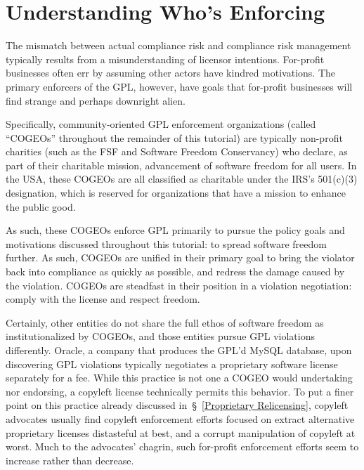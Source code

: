 \section{Understanding Who's Enforcing}
\label{compliance-understanding-whos-enforcing}

The mismatch between actual compliance risk and compliance risk management
typically results from a misunderstanding of licensor intentions.  For-profit
businesses often err by assuming other actors have kindred motivations.  The
primary enforcers of the GPL, however, have goals that for-profit businesses
will find strange and perhaps downright alien.

Specifically, community-oriented GPL enforcement organizations (called
``COGEOs'' throughout the remainder of this tutorial) are typically
non-profit charities (such as the FSF and Software Freedom Conservancy) who
declare, as part of their charitable mission, advancement of software freedom
for all users.  In the USA, these COGEOs are all classified as charitable
under the IRS's 501(c)(3) designation, which is reserved for organizations
that have a mission to enhance the public good.

As such, these COGEOs enforce GPL primarily to pursue the policy goals and
motivations discussed throughout this tutorial: to spread software freedom
further.  As such, COGEOs are unified in their primary goal to bring the
violator back into compliance as quickly as possible, and redress the damage
caused by the violation.  COGEOs are steadfast in their position in a
violation negotiation: comply with the license and respect freedom.

Certainly, other entities do not share the full ethos of software freedom as
institutionalized by COGEOs, and those entities pursue GPL violations
differently.  Oracle, a company that produces the GPL'd MySQL database, upon
discovering GPL violations typically negotiates a proprietary software
license separately for a fee.  While this practice is not one a COGEO would
undertaking nor endorsing, a copyleft license technically permits this
behavior.  To put a finer point on this practice already discussed
in~\S~\ref{Proprietary Relicensing}, copyleft advocates usually find copyleft
enforcement efforts focused on extract alternative proprietary licenses
distasteful at best, and a corrupt manipulation of copyleft at worst.  Much
to the advocates' chagrin, such for-profit enforcement efforts seem to
increase rather than decrease.

